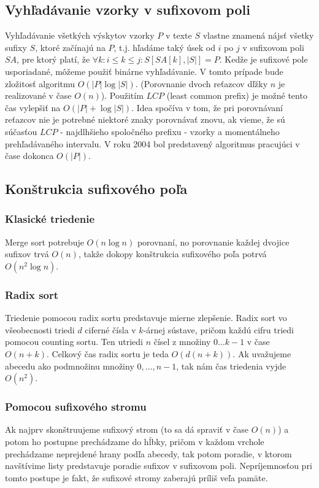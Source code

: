     \subsection{Vyhľadávanie vzorky v sufixovom poli}
    Vyhľadávanie všetkých výskytov vzorky $P$ v texte $S$ vlastne znamená nájsť
    všetky sufixy $S$, ktoré začínajú na $P$, t.j. hľadáme taký úsek od $i$ po
    $j$ v sufixovom poli $SA$, pre ktorý platí, že
    $\forall k: i \leq k \leq j: S[SA[k], \lvert S \rvert] = P$. Kedže je
    sufixové pole usporiadané, môžeme použiť binárne vyhľadávanie. V tomto
    prípade bude zložitosť algoritmu $O(\lvert P \rvert \log \lvert S \rvert)$.
    (Porovnanie dvoch reťazcov dľžky $n$ je realizované v čase $O(n)$). Použitím
    $LCP$ (least common prefix) je možné tento čas vylepšiť na $O(\lvert P
    \rvert + \log{\lvert S \rvert})$. Idea spočíva v tom, že pri porovnávaní
    reťazcov nie je potrebné niektoré znaky porovnávať znovu, ak vieme, že sú
    súčasťou $LCP$ - najdlhšieho spoločného prefixu - vzorky a momentálneho
    prehľadávaného intervalu. V roku 2004 bol predstavený algoritmus
    \cite{AKO04} pracujúci v čase dokonca $O(\lvert P \rvert)$.
    
    \subsection{Konštrukcia sufixového poľa}
    
    
    \subsubsection{Klasické triedenie}
    Merge sort potrebuje $O(n \log{n})$ porovnaní, no porovnanie každej dvojice sufixov trvá $O(n)$, takže dokopy konštrukcia sufixového poľa potrvá $O(n^2 \log{n})$.
    
    \subsubsection{Radix sort}
    Triedenie pomocou radix sortu predstavuje mierne zlepšenie. Radix sort vo všeobecnosti triedi $d$ ciferné čísla v $k$-árnej sústave, pričom každú cifru triedi pomocou counting sortu. Ten utriedi $n$ čísel z množiny ${0 \ldots k - 1}$ v čase $O(n + k)$. Celkový čas radix sortu je teda $O(d (n + k))$. Ak uvažujeme abecedu ako podmnožinu množiny ${0, \ldots, n - 1}$, tak nám čas triedenia vyjde $O(n^2)$.
    \subsubsection{Pomocou sufixového stromu}
Ak najprv skonštruujeme sufixový strom (to sa dá spraviť v čase $O(n)$) a potom ho postupne prechádzame do hĺbky, pričom v každom vrchole prechádzame neprejdené hrany podľa abecedy, tak potom poradie, v ktorom navštívime listy predstavuje poradie sufixov v sufixovom poli. Nepríjemnosťou pri tomto postupe je fakt, že sufixové stromy zaberajú príliš veľa pamäte.

